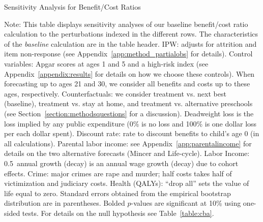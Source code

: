 \begin{table}
\begin{threeparttable}
\caption{Sensitivity Analysis for Benefit/Cost Ratios}
\label{table:bcsens}
\centering
\scriptsize

\begin{tablenotes}
\scriptsize
\item Note: This table displays sensitivity analyses of our baseline benefit/cost ratio calculation to the perturbations indexed in the different rows. The characteristics of the \textit{baseline} calculation are in the table header. IPW: adjusts for attrition and item non-response (see  Appendix~\ref{app:method_partialobs} for details). Control variables: Apgar scores at ages 1 and 5 and a high-risk index (see  Appendix~\ref{appendix:results} for details on how we choose these controls). When forecasting up to ages 21 and 30, we consider all benefits and costs up to these ages, respectively. Counterfactuals: we consider treatment vs. next best (baseline), treatment vs. stay at home, and treatment vs. alternative preschools (see Section~\ref{section:methodsquestions} for a discussion). Deadweight loss is the loss implied by any public expenditure (0\% is no loss and 100\% is one dollar loss per each dollar spent). Discount rate: rate to discount benefits to child's age 0 (in all calculations). Parental labor income: see  Appendix~\ref{app:parentalincome} for details on the two alternative forecasts (Mincer and Life-cycle). Labor Income: 0.5\ annual growth (decay) is an annual wage growth (decay) due to cohort effects. Crime: major crimes are rape and murder; half costs takes half of victimization and judiciary costs. Health (QALYs): ``drop all'' sets the value of life equal to zero. Standard errors obtained from the empirical bootstrap distribution are in parentheses. Bolded $p$-values are significant at 10\% using one-sided tests. For details on the null hypothesis see Table~\ref{table:cba}.
\end{tablenotes}
\end{threeparttable}
\end{table}

